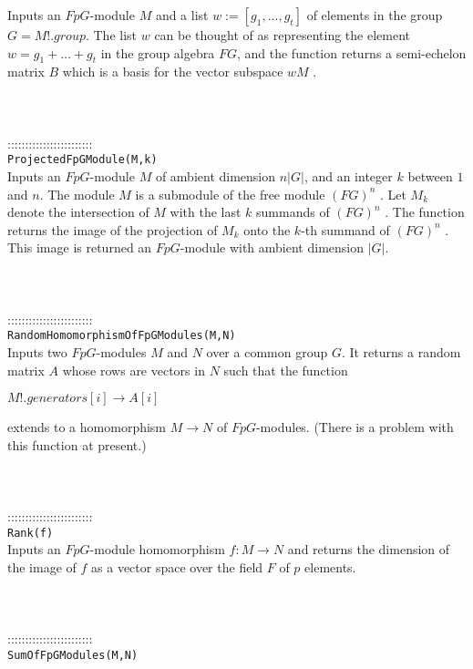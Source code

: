 \documentclass[a4paper,11pt]{report}
\begin{document}
{ Inputs an $FpG$-module $M$ and a list $w:=[g_1 , ..., g_t]$ of elements in the group $G=M!.group$. The list $w$ can be thought of as representing the element $w=g_1 + \ldots + g_t$ in the group algebra $FG$, and the function returns a semi-echelon matrix $B$ which is a basis for the vector subspace $wM$ . \\
 \\
 \\
 \\
 ::::::::::::::::::::::::\\
 \texttt{ProjectedFpGModule(M,k) }\\
 

 Inputs an $FpG$-module $M$ of ambient dimension $n|G|$, and an integer $k$ between $1$ and $n$. The module $M$ is a submodule of the free module $(FG)^n$ . Let $M_k$ denote the intersection of $M$ with the last $k$ summands of $(FG)^n$ . The function returns the image of the projection of $M_k$ onto the $k$-th summand of $(FG)^n$ . This image is returned an $FpG$-module with ambient dimension $|G|$. \\
 \\
 \\
 \\
 ::::::::::::::::::::::::\\
 \texttt{RandomHomomorphismOfFpGModules(M,N) }\\
 

 Inputs two $FpG$-modules $M$ and $N$ over a common group $G$. It returns a random matrix $A$ whose rows are vectors in $N$ such that the function 

 $ M!.generators[i] \longrightarrow A[i]$ 

 extends to a homomorphism $M \longrightarrow N$ of $FpG$-modules. (There is a problem with this function at present.) \\
 \\
 \\
 \\
 ::::::::::::::::::::::::\\
 \texttt{Rank(f) }\\
 

 Inputs an $FpG$-module homomorphism $f:M \longrightarrow N$ and returns the dimension of the image of $f$ as a vector space over the field $F$ of $p$ elements. \\
 \\
 \\
 \\
 ::::::::::::::::::::::::\\
 \texttt{SumOfFpGModules(M,N) }\\
 

}
\end{document}
